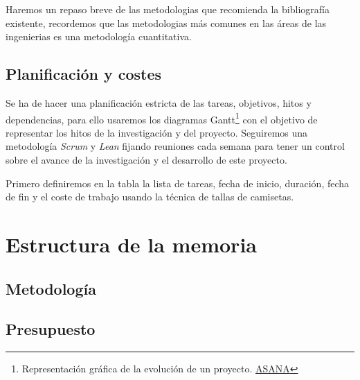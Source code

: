 Haremos un repaso breve de las metodologias que recomienda la bibliografía existente, recordemos que las metodologias más comunes en las áreas de las ingenierias es una metodología cuantitativa.

\subsection{Planificación y costes}

Se ha de hacer una planificación estricta de las tareas, objetivos, hitos y dependencias, para ello usaremos los diagramas Gantt\footnote{Representación gráfica de la evolución de un proyecto. \href{https://asana.com/es/resources/gantt-chart-basics}{ASANA}} con el objetivo de representar los hitos de la investigación y del proyecto.
Seguiremos una metodología \textit{Scrum} y \textit{Lean} fijando reuniones cada semana para tener un control sobre el avance de la investigación y el desarrollo de este proyecto.

Primero definiremos en la tabla la lista de tareas, fecha de inicio, duración, fecha de fin y el coste de trabajo usando la técnica de tallas de camisetas.


\section{Estructura de la memoria}


\subsection{Metodología}


\subsection{Presupuesto}

